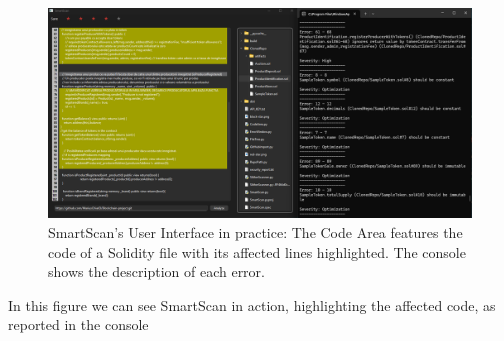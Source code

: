 \begin{figure}[h]
    \centering
    \includegraphics[width=1\linewidth]{images/highlighted-errors.png}
    \caption{SmartScan's User Interface in practice: The Code Area features the code of a Solidity file with its affected lines highlighted. The console shows the description of each error.}
    \label{fig:enter-label}
\end{figure}

In this figure we can see SmartScan in action, highlighting the affected code, as reported in the console



